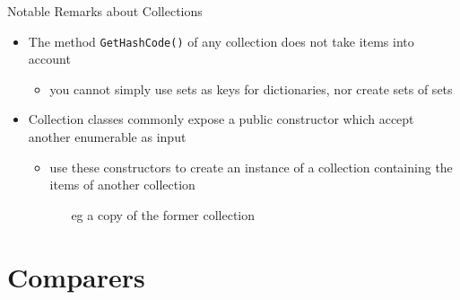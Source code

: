 \documentclass[presentation]{beamer}
\begin{document}
\begin{frame}[allowframebreaks]{Notable Remarks about \dotnet Collections}
\begin{itemize}
    \bigskip

    \item The method \texttt{GetHashCode()} of any collection does not take items into account
    \begin{itemize}
      \item you \alert{cannot} simply use \alert{sets as keys} for dictionaries, nor create \alert{sets of sets}
    \end{itemize}

    \bigskip

    \item Collection \alert{classes} commonly expose a public constructor which accept another \alert{enumerable} as input
    \begin{itemize}
      \item use these constructors to create an instance of a collection containing the items of another collection
      \begin{itemize}
        \item[eg] a \alert{copy} of the former collection
      \end{itemize}
    \end{itemize}
  \end{itemize}
  
\end{frame}

\section{Comparers}
\end{document}
